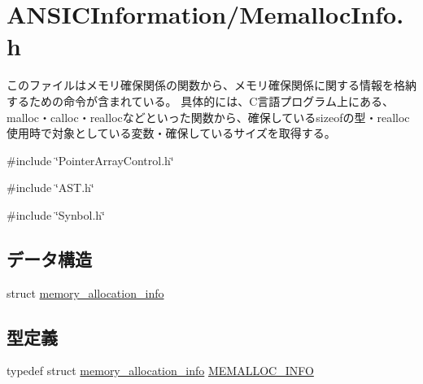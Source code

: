\section{ANSICInformation/MemallocInfo.h}
\label{MemallocInfo_8h}


このファイルはメモリ確保関係の関数から、メモリ確保関係に関する情報を格納するための命令が含まれている。 具体的には、C言語プログラム上にある、malloc・calloc・reallocなどといった関数から、確保しているsizeofの型・realloc使用時で対象としている変数・確保しているサイズを取得する。  


{\ttfamily \#include \char`\"{}PointerArrayControl.h\char`\"{}}\par
{\ttfamily \#include \char`\"{}AST.h\char`\"{}}\par
{\ttfamily \#include \char`\"{}Synbol.h\char`\"{}}\par
\subsection*{データ構造}
\begin{DoxyCompactItemize}
\item 
struct \hyperlink{structmemory__allocation__info}{memory\_\-allocation\_\-info}
\end{DoxyCompactItemize}
\subsection*{型定義}
\begin{DoxyCompactItemize}
\item 
typedef struct \hyperlink{structmemory__allocation__info}{memory\_\-allocation\_\-info} \hyperlink{MemallocInfo_8h_ac195f09baa3fd86235c8bf9c0c103888}{MEMALLOC\_\-INFO}
\end{DoxyCompactItemize}
